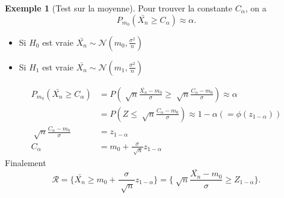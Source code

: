 \documentclass{article}
\theoremstyle{plain}%
\theoremstyle{definition}
\newtheorem{exmp}{Exemple}[section]
\theoremstyle{remark}
\begin{document}
\begin{exmp}[Test sur la moyenne]
    Pour trouver la constante $ C_\alpha  $, on a
    \[
        P_{m_0} (\bar{X_n} \geq C_\alpha) \approx \alpha 
    .\]
    \begin{itemize}
        \item Si $ H_0 $ est vraie $ \bar{X_n} \sim \mathcal{N}(m_0, \frac{\sigma ^2}{n}) $ 
        \item Si $ H_1 $ est vraie $ \bar{X_n} \sim \mathcal{N}(m_1, \frac{\sigma ^2}{n}) $ 
    \end{itemize}
    \begin{align*}
        P_{m_0}(\bar{X_n} \geq C_\alpha ) &= P(\sqrt[]{n} \frac{\bar{X_n} - m_0}{\sigma } \geq \sqrt[]{n}\frac{C_\alpha - m_0}{\sigma }) \approx \alpha \\
        &= P(Z \leq \sqrt[]{n}\frac{C_\alpha - m_0}{\sigma }) \approx 1 - \alpha (= \phi (z_{1-\alpha })) \\
        \sqrt[]{n}\frac{C_\alpha - m_0}{\sigma } &= z_{1- \alpha} \\
        C_\alpha &= m_0 + \frac{\sigma }{\sqrt[]{n}}z_{1-\alpha }
    \end{align*}
    Finalement 
    \[
        \mathcal{R} = \{\bar{X_n} \geq m_0 + \frac{\sigma }{\sqrt[]{n}} z_{1-\alpha }\} = \{\sqrt[]{n} \frac{\bar{X_n} - m_0}{\sigma } \geq Z_{1-\alpha }\}
    .\]
\end{exmp}
\end{document}
